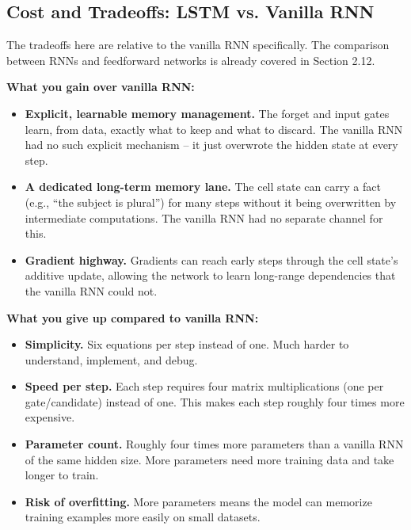 \subsection{Cost and Tradeoffs: LSTM vs. Vanilla RNN}

The tradeoffs here are relative to the vanilla RNN specifically. The comparison
between RNNs and feedforward networks is already covered in Section 2.12.

\textbf{What you gain over vanilla RNN:}

\begin{itemize}
    \item \textbf{Explicit, learnable memory management.} The forget and input gates
    learn, from data, exactly what to keep and what to discard. The vanilla RNN had no
    such explicit mechanism -- it just overwrote the hidden state at every step.
    \item \textbf{A dedicated long-term memory lane.} The cell state can carry a fact
    (e.g., ``the subject is plural'') for many steps without it being overwritten by
    intermediate computations. The vanilla RNN had no separate channel for this.
    \item \textbf{Gradient highway.} Gradients can reach early steps through the cell
    state's additive update, allowing the network to learn long-range dependencies that
    the vanilla RNN could not.
\end{itemize}

\textbf{What you give up compared to vanilla RNN:}

\begin{itemize}
    \item \textbf{Simplicity.} Six equations per step instead of one. Much harder to
    understand, implement, and debug.
    \item \textbf{Speed per step.} Each step requires four matrix multiplications
    (one per gate/candidate) instead of one. This makes each step roughly four times
    more expensive.
    \item \textbf{Parameter count.} Roughly four times more parameters than a vanilla
    RNN of the same hidden size. More parameters need more training data and take
    longer to train.
    \item \textbf{Risk of overfitting.} More parameters means the model can memorize
    training examples more easily on small datasets.
\end{itemize}



